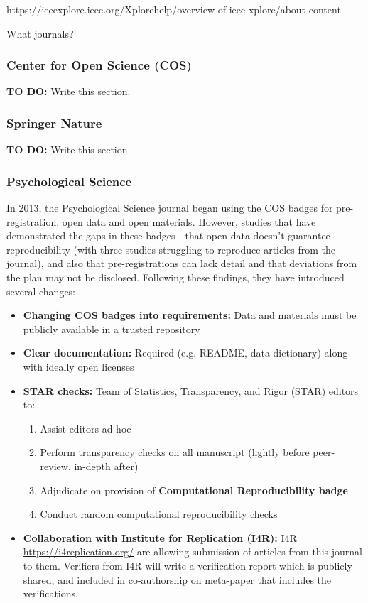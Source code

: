 https://ieeexplore.ieee.org/Xplorehelp/overview-of-ieee-xplore/about-content

What journals?

\subsubsection{Center for Open Science (COS)}

\textbf{TO DO:} Write this section.

\subsubsection{Springer Nature}

\textbf{TO DO:} Write this section.

\subsubsection{Psychological Science}

In 2013, the Psychological Science journal began using the COS badges for pre-registration, open data and open materials. However, studies that have demonstrated the gaps in these badges - that open data doesn't guarantee reproducibility (with three studies struggling to reproduce articles from the journal), and also that pre-registrations can lack detail and that deviations from the plan may not be disclosed. Following these findings, they have introduced several changes:

\begin{itemize}
    \item \textbf{Changing COS badges into requirements:} Data and materials must be publicly available in a trusted repository
    \item \textbf{Clear documentation:} Required (e.g. README, data dictionary) along with ideally open licenses
    \item \textbf{STAR checks:} Team of Statistics, Transparency, and Rigor (STAR) editors to:
    \begin{enumerate}
        \item Assist editors ad-hoc
        \item Perform transparency checks on all manuscript (lightly before peer-review, in-depth after)
        \item Adjudicate on provision of \textbf{Computational Reproducibility badge}
        \item Conduct random computational reproducibility checks
    \end{enumerate}
    \item \textbf{Collaboration with Institute for Replication (I4R):} I4R \url{https://i4replication.org/} are allowing submission of articles from this journal to them. Verifiers from I4R will write a verification report which is publicly shared, and included in co-authorship on meta-paper that includes the verifications.
\end{itemize}